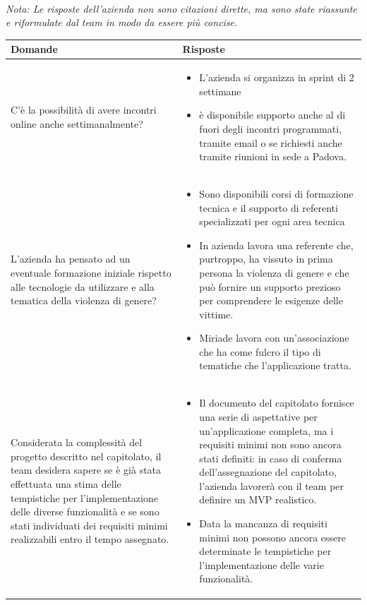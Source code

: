 \documentclass[a4paper,11pt]{article}
\begin{document}
\paragraph{}
\begin{center}
\small\textit{Nota: Le risposte dell'azienda non sono citazioni dirette, ma sono state riassunte e riformulate dal team in modo da essere più concise.}
\end{center}

{\footnotesize
\begin{tabularx}{\textwidth}{|>{\raggedright\arraybackslash}X|>{\raggedright\arraybackslash}X|}
\hline
\textbf{Domande} & \textbf{Risposte} \\
\hline
C'è la possibilità di avere incontri online anche settimanalmente?
&
\begin{itemize}
  \item L'azienda si organizza in sprint di 2 settimane
  \item è disponibile supporto anche al di fuori degli incontri programmati, tramite email o se richiesti anche tramite riunioni in sede a Padova.
\end{itemize}
\\
\hline
L'azienda ha pensato ad un eventuale formazione iniziale rispetto alle tecnologie da utilizzare e alla tematica della violenza di genere?
&
\begin{itemize}
  \item Sono disponibili corsi di formazione tecnica e il supporto di referenti specializzati per ogni area tecnica
  \item In azienda lavora una referente che, purtroppo, ha vissuto in prima persona la violenza di genere e che può fornire un supporto prezioso per comprendere le esigenze delle vittime.
  \item Miriade lavora con un'associazione che ha come fulcro il tipo di tematiche che l'applicazione tratta. 
\end{itemize}\\
\hline
Considerata la complessità del progetto descritto nel capitolato, il team desidera sapere se è già stata effettuata una stima delle tempistiche per l'implementazione delle diverse funzionalità e se sono stati individuati dei requisiti minimi realizzabili entro il tempo assegnato.
&
\begin{itemize}
  \item Il documento del capitolato fornisce una serie di aspettative per un'applicazione completa, ma i requisiti minimi non sono ancora stati definiti: in caso di conferma dell'assegnazione del capitolato, l'azienda lavorerà con il team per definire un MVP realistico.
  \item Data la mancanza di requisiti minimi non possono ancora essere determinate le tempistiche per l'implementazione delle varie funzionalità.
\end{itemize}\\
\hline
\end{tabularx}
}  
\end{document}
